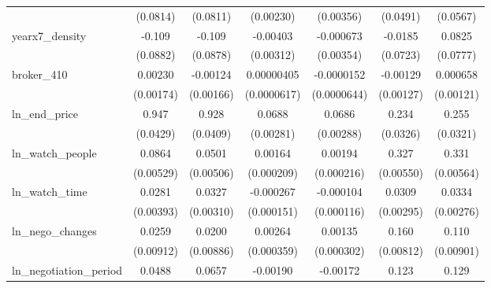 {\begin{tabular}{l*{6}{c}}
            &    (0.0814)         &    (0.0811)         &   (0.00230)         &   (0.00356)         &    (0.0491)         &    (0.0567)         \\
\addlinespace
yearx7\_density&      -0.109         &      -0.109         &    -0.00403         &   -0.000673         &     -0.0185         &      0.0825         \\
            &    (0.0882)         &    (0.0878)         &   (0.00312)         &   (0.00354)         &    (0.0723)         &    (0.0777)         \\
\addlinespace
broker\_410  &     0.00230         &    -0.00124         &  0.00000405         &  -0.0000152         &    -0.00129         &    0.000658         \\
            &   (0.00174)         &   (0.00166)         & (0.0000617)         & (0.0000644)         &   (0.00127)         &   (0.00121)         \\
\addlinespace
ln\_end\_price&       0.947\sym{***}&       0.928\sym{***}&      0.0688\sym{***}&      0.0686\sym{***}&       0.234\sym{***}&       0.255\sym{***}\\
            &    (0.0429)         &    (0.0409)         &   (0.00281)         &   (0.00288)         &    (0.0326)         &    (0.0321)         \\
\addlinespace
ln\_watch\_people&      0.0864\sym{***}&      0.0501\sym{***}&     0.00164\sym{***}&     0.00194\sym{***}&       0.327\sym{***}&       0.331\sym{***}\\
            &   (0.00529)         &   (0.00506)         &  (0.000209)         &  (0.000216)         &   (0.00550)         &   (0.00564)         \\
\addlinespace
ln\_watch\_time&      0.0281\sym{***}&      0.0327\sym{***}&   -0.000267\sym{*}  &   -0.000104         &      0.0309\sym{***}&      0.0334\sym{***}\\
            &   (0.00393)         &   (0.00310)         &  (0.000151)         &  (0.000116)         &   (0.00295)         &   (0.00276)         \\
\addlinespace
ln\_nego\_changes&      0.0259\sym{***}&      0.0200\sym{**} &     0.00264\sym{***}&     0.00135\sym{***}&       0.160\sym{***}&       0.110\sym{***}\\
            &   (0.00912)         &   (0.00886)         &  (0.000359)         &  (0.000302)         &   (0.00812)         &   (0.00901)         \\
\addlinespace
ln\_negotiation\_period&      0.0488\sym{***}&      0.0657\sym{***}&    -0.00190\sym{***}&    -0.00172\sym{***}&       0.123\sym{***}&       0.129\sym{***}\\

\end{tabular}}
